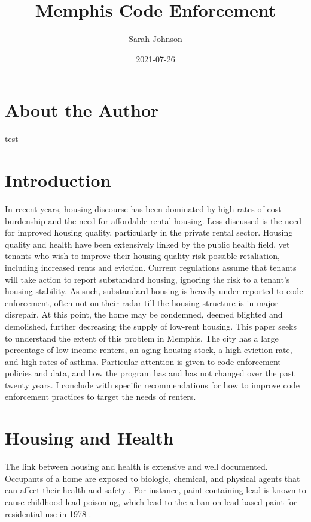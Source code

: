 \documentclass[
]{book}
\title{Memphis Code Enforcement}
\author{Sarah Johnson}
\date{2021-07-26}
\begin{document}
\maketitle

{
\setcounter{tocdepth}{1}
\tableofcontents
}
\hypertarget{about-the-author}{%
\chapter*{About the Author}\label{about-the-author}}

test

\hypertarget{intro}{%
\chapter{Introduction}\label{intro}}

In recent years, housing discourse has been dominated by high rates of cost burdenship and the need for affordable rental housing. Less discussed is the need for improved housing quality, particularly in the private rental sector. Housing quality and health have been extensively linked by the public health field, yet tenants who wish to improve their housing quality risk possible retaliation, including increased rents and eviction. Current regulations assume that tenants will take action to report substandard housing, ignoring the risk to a tenant's housing stability. As such, substandard housing is heavily under-reported to code enforcement, often not on their radar till the housing structure is in major disrepair. At this point, the home may be condemned, deemed blighted and demolished, further decreasing the supply of low-rent housing. This paper seeks to understand the extent of this problem in Memphis. The city has a large percentage of low-income renters, an aging housing stock, a high eviction rate, and high rates of asthma. Particular attention is given to code enforcement policies and data, and how the program has and has not changed over the past twenty years. I conclude with specific recommendations for how to improve code enforcement practices to target the needs of renters.

\hypertarget{housing-and-health}{%
\chapter{Housing and Health}\label{housing-and-health}}

The link between housing and health is extensive and well documented. Occupants of a home are exposed to biologic, chemical, and physical agents that can affect their health and safety \citep[ 63]{cdc2006}. For instance, paint containing lead is known to cause childhood lead poisoning, which lead to the a ban on lead-based paint for residential use in 1978 \citep{cdc2020}.
\end{document}
